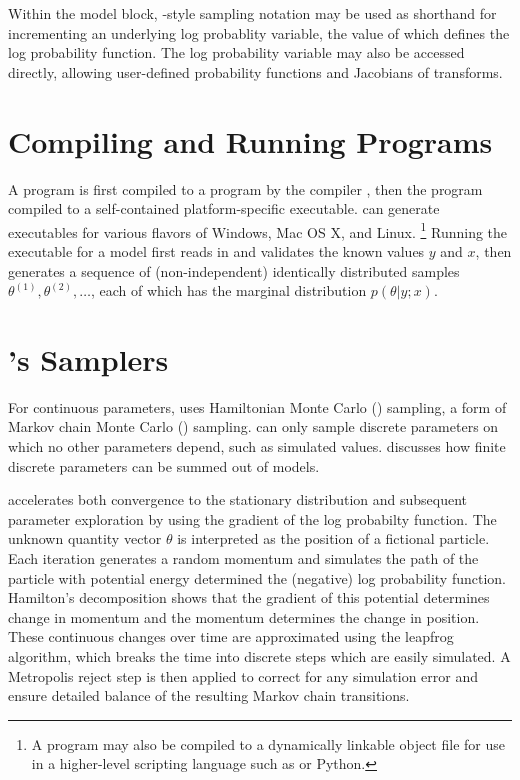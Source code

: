 Within the model block, \BUGS-style sampling notation may be used as
shorthand for incrementing an underlying log probablity variable, the
value of which defines the log probability function.  The log
probability variable may also be accessed directly, allowing
user-defined probability functions and Jacobians of transforms.


\section{Compiling and Running \Stan Programs}

A \Stan program is first compiled to a \Cpp program by the \Stan
compiler \stanc, then the \Cpp program compiled to a self-contained
platform-specific executable.  \Stan can generate executables for
various flavors of Windows, Mac OS X, and Linux.%
%
\footnote{A \Stan program may also be compiled to a dynamically
  linkable object file for use in a higher-level scripting language
  such as \R or Python.}
%
Running the \Stan executable for a model first reads in and validates
the known values $y$ and $x$, then generates a sequence of
(non-independent) identically distributed samples $\theta^{(1)},
\theta^{(2)}, \ldots$, each of which has the marginal distribution
$p(\theta|y;x)$.


\section{\Stan's Samplers}

For continuous parameters, \Stan uses Hamiltonian Monte Carlo (\HMC)
sampling, a form of Markov chain Monte Carlo (\MCMC) sampling.   can only sample discrete parameters on which no other parameters
depend, such as simulated values.  
discusses how finite discrete parameters can be summed out of models.

\HMC accelerates both convergence to the stationary distribution and
subsequent parameter exploration by using the gradient of the log
probabilty function.  The unknown quantity vector $\theta$ is
interpreted as the position of a fictional particle.  Each iteration
generates a random momentum and simulates the path of the particle
with potential energy determined the (negative) log probability
function.  Hamilton's decomposition shows that the gradient of this
potential determines change in momentum and the momentum determines
the change in position.  These continuous changes over time are
approximated using the leapfrog algorithm, which breaks the time into
discrete steps which are easily simulated.  A Metropolis reject step
is then applied to correct for any simulation error and ensure
detailed balance of the resulting Markov chain transitions.

